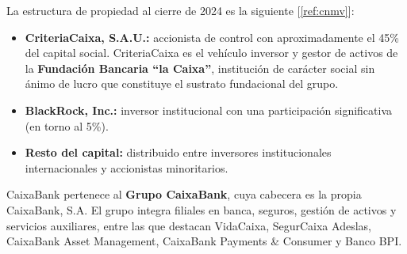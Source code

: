 La estructura de propiedad al cierre de 2024 es la siguiente [\ref{ref:cnmv}]:

\begin{itemize}
  \item \textbf{CriteriaCaixa, S.A.U.:} accionista de control con aproximadamente el
    45\% del capital social. CriteriaCaixa es el vehículo inversor y gestor de activos de
    la \textbf{Fundación Bancaria ``la Caixa''}, institución de carácter social sin ánimo
    de lucro que constituye el sustrato fundacional del grupo.
  \item \textbf{BlackRock, Inc.:} inversor institucional con una participación
    significativa (en torno al 5\%).
  \item \textbf{Resto del capital:} distribuido entre inversores institucionales
    internacionales y accionistas minoritarios.
\end{itemize}

CaixaBank pertenece al \textbf{Grupo CaixaBank}, cuya cabecera es la propia
CaixaBank, S.A. El grupo integra filiales en banca, seguros, gestión de activos y
servicios auxiliares, entre las que destacan VidaCaixa, SegurCaixa Adeslas, CaixaBank
Asset Management, CaixaBank Payments \& Consumer y Banco BPI.

\endinput
